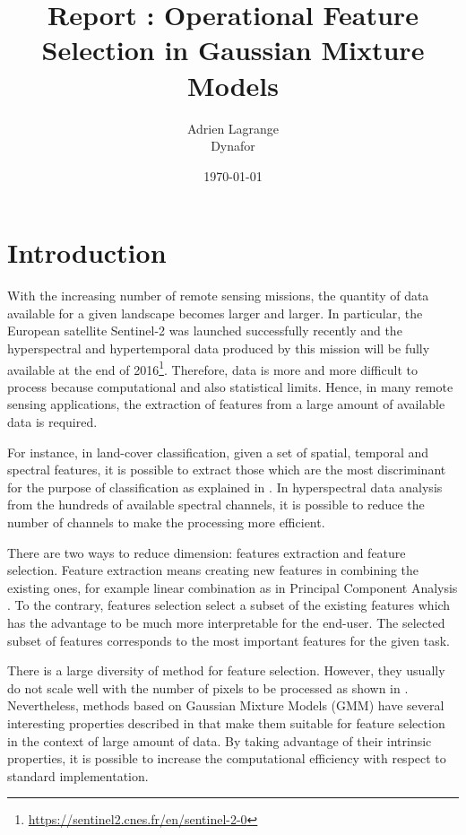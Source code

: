 \documentclass[a4paper,11pt,DIV=16]{scrartcl}
\title{Report : Operational Feature Selection in Gaussian Mixture Models}
\author{Adrien Lagrange
\\
\small{Dynafor}}
\date{\today}
\begin{document}
\maketitle

\section{Introduction}

With the increasing number of remote sensing missions, the quantity of data available for a given landscape becomes larger and larger. In particular, the European satellite Sentinel-2 was launched successfully recently and the hyperspectral and hypertemporal data produced by this mission will be fully available at the end of 2016\footnote{\url{https://sentinel2.cnes.fr/en/sentinel-2-0}}. Therefore, data is more and more difficult to process because computational and also statistical limits. Hence, in many remote sensing applications, the extraction of features from a large amount of available data is required.

For instance, in land-cover classification, given a set of spatial, temporal and spectral features, it is possible to extract those which are the most discriminant for the purpose of classification as explained in \cite{Guyon:2006:FEF:1208773}. In hyperspectral data analysis from the hundreds of available spectral channels, it is possible to reduce the number of channels to make the processing more efficient.

There are two ways to reduce dimension: features extraction and feature selection. Feature extraction means creating new features in combining the existing ones, for example linear combination as in Principal Component Analysis \cite{jimenez1998supervised}. To the contrary, features selection select a subset of the existing features which has the advantage to be much more interpretable for the end-user. The selected subset of features corresponds to the most important features for the given task.

There is a large diversity of method for feature selection. However, they usually do not scale well with the number of pixels to be processed as shown in \cite{fauvel2015fast}. Nevertheless, methods based on Gaussian Mixture Models (GMM) have several interesting properties described in \cite{webb2003statistical} that make them suitable for feature selection in the context of large amount of data. By taking advantage of their intrinsic properties, it is possible to increase the computational efficiency with respect to standard implementation.
\end{document}
